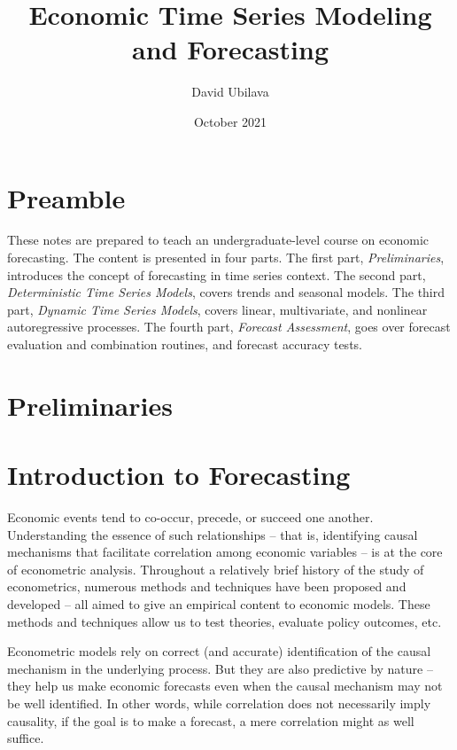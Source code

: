 \documentclass[
  oneside]{book}
\title{Economic Time Series Modeling and Forecasting}
\author{David Ubilava}
\date{October 2021}
\begin{document}
\maketitle

{
\setcounter{tocdepth}{1}
\tableofcontents
}
\hypertarget{preamble}{%
\chapter*{Preamble}\label{preamble}}

These notes are prepared to teach an undergraduate-level course on economic forecasting. The content is presented in four parts. The first part, \emph{Preliminaries}, introduces the concept of forecasting in time series context. The second part, \emph{Deterministic Time Series Models}, covers trends and seasonal models. The third part, \emph{Dynamic Time Series Models}, covers linear, multivariate, and nonlinear autoregressive processes. The fourth part, \emph{Forecast Assessment}, goes over forecast evaluation and combination routines, and forecast accuracy tests.

\hypertarget{preliminaries}{%
\chapter*{Preliminaries}\label{preliminaries}}

\hypertarget{introduction-to-forecasting}{%
\chapter{Introduction to Forecasting}\label{introduction-to-forecasting}}

Economic events tend to co-occur, precede, or succeed one another. Understanding the essence of such relationships -- that is, identifying causal mechanisms that facilitate correlation among economic variables -- is at the core of econometric analysis. Throughout a relatively brief history of the study of econometrics, numerous methods and techniques have been proposed and developed -- all aimed to give an empirical content to economic models. These methods and techniques allow us to test theories, evaluate policy outcomes, etc.

Econometric models rely on correct (and accurate) identification of the causal mechanism in the underlying process. But they are also predictive by nature -- they help us make economic forecasts even when the causal mechanism may not be well identified. In other words, while correlation does not necessarily imply causality, if the goal is to make a forecast, a mere correlation might as well suffice.
\end{document}
